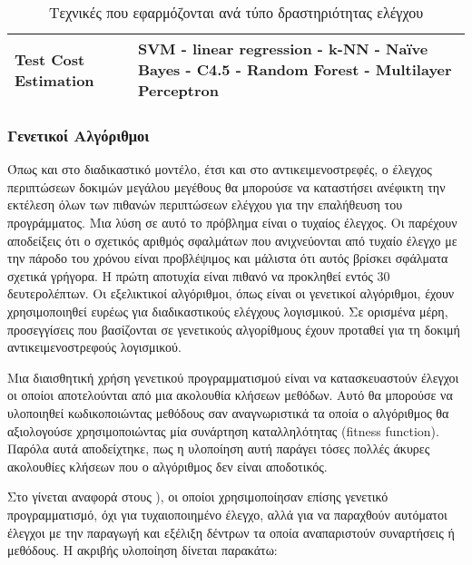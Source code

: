 \documentclass[12pt]{article}
\begin{document}
\begin{table}[]
\begin{tabular}{|p{}|p{}|}
Test Cost Estimation               & SVM - linear regression - k-NN - Naïve Bayes - C4.5 - Random Forest - Multilayer Perceptron                                                                                                                                                                                                            \\ \hline
\end{tabular}
\caption{Τεχνικές που εφαρμόζονται ανά τύπο δραστηριότητας ελέγχου}
\end{table}

\subsubsection{Γενετικοί Αλγόριθμοι}

Όπως και στο διαδικαστικό μοντέλο, έτσι και στο αντικειμενοστρεφές, ο έλεγχος περιπτώσεων δοκιμών μεγάλου μεγέθους θα μπορούσε να καταστήσει ανέφικτη την εκτέλεση όλων των πιθανών περιπτώσεων ελέγχου για την επαλήθευση του προγράμματος. Μια λύση σε αυτό το πρόβλημα είναι ο τυχαίος έλεγχος. Οι \textcite{ciupa} παρέχουν αποδείξεις ότι ο σχετικός αριθμός σφαλμάτων που ανιχνεύονται από τυχαίο έλεγχο με την πάροδο του χρόνου είναι προβλέψιμος και μάλιστα ότι αυτός βρίσκει σφάλματα σχετικά γρήγορα. Η πρώτη αποτυχία είναι πιθανό να προκληθεί εντός 30 δευτερολέπτων. Οι εξελικτικοί αλγόριθμοι, όπως είναι οι γενετικοί αλγόριθμοι, έχουν χρησιμοποιηθεί ευρέως για διαδικαστικούς ελέγχους λογισμικού. Σε ορισμένα μέρη, προσεγγίσεις που βασίζονται σε γενετικούς αλγορίθμους έχουν προταθεί για τη δοκιμή αντικειμενοστρεφούς λογισμικού.

\par Μια διαισθητική χρήση γενετικού προγραμματισμού είναι να κατασκευαστούν έλεγχοι οι οποίοι αποτελούνται από μια ακολουθία κλήσεων μεθόδων. Αυτό θα μπορούσε να υλοποιηθεί κωδικοποιώντας μεθόδους σαν αναγνωριστικά τα οποία ο αλγόριθμος θα αξιολογούσε χρησιμοποιώντας μία συνάρτηση καταλληλότητας (fitness function). Παρόλα αυτά αποδείχτηκε, πως η υλοποίηση αυτή παράγει τόσες πολλές άκυρες ακολουθίες κλήσεων που ο αλγόριθμος δεν είναι αποδοτικός.

\par Στο \textcite{meziane} γίνεται αναφορά στους \textcite{wappler}), οι οποίοι χρησιμοποίησαν επίσης γενετικό προγραμματισμό, όχι για τυχαιοποιημένο έλεγχο, αλλά για να παραχθούν αυτόματοι έλεγχοι με την παραγωγή και εξέλιξη δέντρων τα οποία αναπαριστούν συναρτήσεις ή μεθόδους. Η ακριβής υλοποίηση δίνεται παρακάτω:
\end{document}
